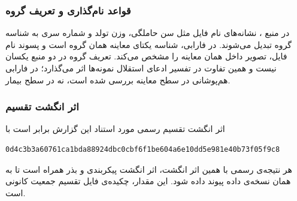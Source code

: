 \subsubsection{قواعد نام‌گذاری و تعریف گروه}

در منبع ، نشانه‌های نام فایل مثل سن حاملگی، وزن تولد و شماره سری به شناسه گروه تبدیل می‌شوند. در فارابی، شناسه یکتای معاینه همان گروه است و پسوند نام فایل، تصویر داخل همان معاینه را مشخص می‌کند. تعریف گروه در دو منبع یکسان نیست و همین تفاوت در تفسیر ادعای استقلال نمونه‌ها اثر می‌گذارد؛ در فارابی هم‌پوشانی در سطح معاینه بررسی شده است، نه در سطح بیمار.

\subsubsection{اثر انگشت تقسیم}

اثر انگشت تقسیم رسمی مورد استناد این گزارش برابر است با
\begin{latin}
\begin{verbatim}
0d4c3b3a60761ca1bda88924dbc0cbf6f1be604a6e10dd5e981e40b73f05f9c8
\end{verbatim}
\end{latin}

هر نتیجه‌ی رسمی با همین اثر انگشت، اثر انگشت پیکربندی و بذر همراه است تا به همان نسخه‌ی داده پیوند داده شود. این مقدار، چکیده‌ی  فایل تقسیم جمعیت کانونی است.
\clearpage
